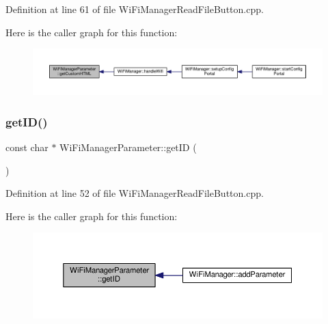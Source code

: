 Definition at line 61 of file Wi\+Fi\+Manager\+Read\+File\+Button.\+cpp.

Here is the caller graph for this function\+:\nopagebreak
\begin{figure}[H]
\begin{center}
\leavevmode
\includegraphics[width=350pt]{class_wi_fi_manager_parameter_a596273c189eb40107500cee3ad31b13b_icgraph}
\end{center}
\end{figure}
\mbox{\label{class_wi_fi_manager_parameter_af57919615418fff788310ba9cc2664d8}} 
\subsubsection{\texorpdfstring{get\+I\+D()}{getID()}}
{\footnotesize\ttfamily const char $\ast$ Wi\+Fi\+Manager\+Parameter\+::get\+ID (\begin{DoxyParamCaption}{ }\end{DoxyParamCaption})}



Definition at line 52 of file Wi\+Fi\+Manager\+Read\+File\+Button.\+cpp.

Here is the caller graph for this function\+:\nopagebreak
\begin{figure}[H]
\begin{center}
\leavevmode
\includegraphics[width=350pt]{class_wi_fi_manager_parameter_af57919615418fff788310ba9cc2664d8_icgraph}
\end{center}
\end{figure}
\mbox{\label{class_wi_fi_manager_parameter_a69124c6f46876d1ede54177c692e3382}} 
